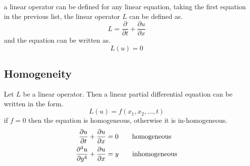 \documentclass[]{article}
\begin{document}
a linear operator can be defined for any linear equation, taking the first equation in the previous list, the linear operator $L$ can be defined as.
\[
L = \frac{\partial }{\partial t} + \frac{\partial u}{\partial x}
\]
and the equation can be written as.
\[
    L(u)=0    
\]

\subsection{Homogeneity}
Let $L$ be a linear operator. Then a linear partial differential equation can be written in the form.
\[
    L(u) = f(x_1,x_2, \dots , t)    
\]
if $f = 0$ then the equation is homogeneous, otherwise it is in-homogeneous.
\begin{align*}
\frac{\partial u}{\partial t} + \frac{\partial u}{\partial x} &= 0 \quad\quad \text{homogeneous}
\\
\frac{\partial^4 u}{\partial y^4} + \frac{\partial u}{\partial x} &= y \quad\quad \text{inhomogeneous}
\end{align*}

\newpage
\end{document}
